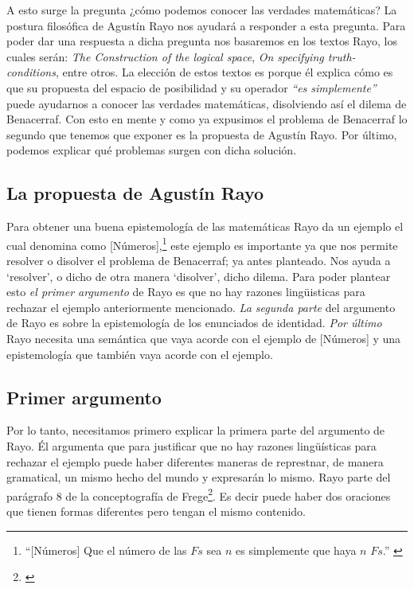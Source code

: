 \documentclass[]{article}
\begin{document}
A esto surge la pregunta ¿c\'omo podemos conocer las verdades 
matemáticas? La postura filos\'ofica de Agustín Rayo nos ayudará 
a responder a esta pregunta. Para poder dar una 
respuesta a dicha pregunta nos basaremos en
los textos Rayo, los cuales serán:  
\textit{The Construction of the logical space}, \textit{On 
specifying truth-conditions}, entre otros. La elección de estos textos 
es porque él explica c\'omo es que su propuesta del 
espacio de posibilidad y su operador \textit{``es 
simplemente''} puede ayudarnos a conocer las verdades 
matemáticas, disolviendo así el dilema de Benacerraf. 
Con esto en mente y como ya expusimos el problema de Benacerraf
lo segundo que tenemos que exponer es la propuesta 
de Agustín Rayo. Por último, podemos explicar qu\'e problemas 
surgen con dicha solución.   

\subsection*{La propuesta de Agustín Rayo}
\noindent Para obtener una buena epistemología de las 
matemáticas Rayo da un ejemplo el cual denomina como 
[Números],\footnote{ 
    ``[Números] 
    Que el número de las $Fs$ sea $n$ es simplemente 
    que haya $n$ $Fs$.'' \cite{rayo2013} 
} este ejemplo es importante ya que nos permite 
resolver o disolver el problema de Benacerraf; ya antes planteado. 
Nos ayuda a `resolver', o dicho de otra manera `disolver', 
dicho dilema. Para poder plantear esto 
\textit{el primer argumento} de Rayo es que no hay razones lingüisticas para 
rechazar el ejemplo anteriormente mencionado. \textit{La segunda parte} del 
argumento de Rayo es sobre la epistemología de los enunciados de 
identidad. \textit{Por último} Rayo necesita una semántica que vaya acorde 
con el ejemplo de [Números] y una epistemología que también 
vaya acorde con el ejemplo. 


\subsection*{\small Primer argumento}

Por lo tanto, necesitamos primero explicar la primera parte del 
argumento de Rayo. Él argumenta que para justificar 
que no hay razones lingüísticas para rechazar el ejemplo puede haber 
diferentes maneras de represtnar, de manera gramatical, un mismo hecho 
del mundo y expresarán lo mismo. Rayo parte del parágrafo 8 de la 
conceptografía de Frege\footnote{\cite{frege2016escritos}}. Es decir 
puede haber dos oraciones que tienen formas diferentes pero 
tengan el mismo contenido. 
\end{document}
